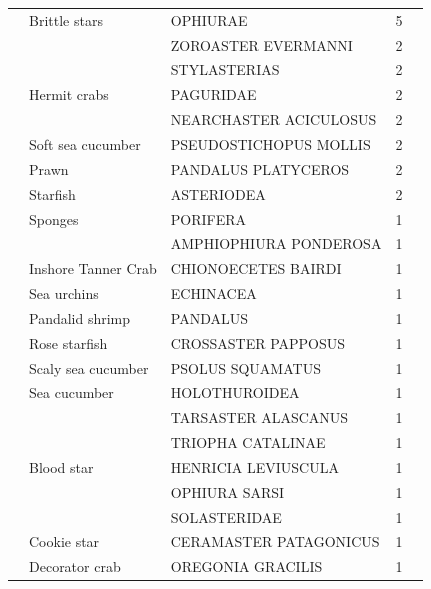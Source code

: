 \documentclass[12pt]{article}\usepackage[]{graphicx}\usepackage[]{color}
\begin{document}
\begin{longtable}[l]{lllrl}
 & Brittle stars & OPHIURAE & 5 & \\
 &  & ZOROASTER EVERMANNI & 2 & \\
 &  & STYLASTERIAS & 2 & \\
 & Hermit crabs & PAGURIDAE & 2 & \\
 &  & NEARCHASTER ACICULOSUS & 2 & \\
 & Soft sea cucumber & PSEUDOSTICHOPUS MOLLIS & 2 & \\
 & Prawn & PANDALUS PLATYCEROS & 2 & \\
 & Starfish & ASTERIODEA & 2 & \\
 & Sponges & PORIFERA & 1 & \\
 &  & AMPHIOPHIURA PONDEROSA & 1 & \\
 & Inshore Tanner Crab & CHIONOECETES BAIRDI & 1 & \\
 & Sea urchins & ECHINACEA & 1 & \\
 & Pandalid shrimp & PANDALUS & 1 & \\
 & Rose starfish & CROSSASTER PAPPOSUS & 1 & \\
 & Scaly sea cucumber & PSOLUS SQUAMATUS & 1 & \\
 & Sea cucumber & HOLOTHUROIDEA & 1 & \\
 &  & TARSASTER ALASCANUS & 1 & \\
 &  & TRIOPHA CATALINAE & 1 & \\
 & Blood star & HENRICIA LEVIUSCULA & 1 & \\
 &  & OPHIURA SARSI & 1 & \\
 &  & SOLASTERIDAE & 1 & \\
 & Cookie star & CERAMASTER PATAGONICUS & 1 & \\
 & Decorator crab & OREGONIA GRACILIS & 1 & \\*
\end{longtable}
\endgroup{}

~\\
\hspace*{0.333em}\\
\end{document}

